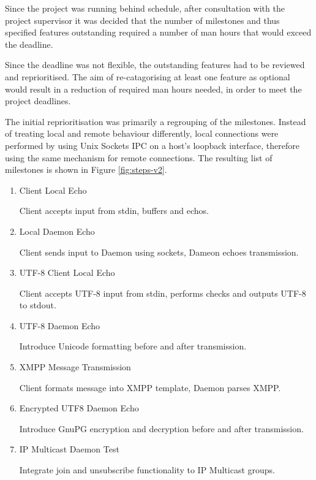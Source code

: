 
Since the project was running behind schedule, after consultation with
the project supervisor it was decided that the number of milestones and
thus specified features outstanding required a number of man hours that
would exceed the deadline.


Since the deadline was not flexible, the outstanding features had to be 
reviewed and reprioritised. The aim of re-catagorising at least one 
feature as optional would result in a reduction of required man hours 
needed, in order to meet the project deadlines.


The initial reprioritisation was primarily a regrouping of the
milestones. Instead of treating local and remote behaviour differently,
local connections were performed by using Unix Sockets IPC on a host's
loopback interface, therefore using the same mechanism for remote
connections. The resulting list of milestones is shown in Figure
\ref{fig:steps-v2}.

\begin{table}[hbt]
\label{fig:steps-v2}

\begin{center}

\begin{enumerate}

\item Client Local Echo 

	\subitem Client accepts input from stdin, buffers and echos.

\item Local Daemon Echo 

	\subitem Client sends input to Daemon using sockets, Dameon 
	echoes transmission.

\item UTF-8 Client Local Echo 

	\subitem Client accepts UTF-8 input from stdin, performs checks and
	outputs UTF-8 to stdout.

\item UTF-8 Daemon Echo

	\subitem Introduce Unicode formatting before and after transmission.

\item XMPP Message Transmission 

	\subitem Client formats message into XMPP template, Daemon parses
	XMPP.

\item Encrypted UTF8 Daemon Echo 

	\subitem Introduce GnuPG encryption and decryption before and after 
	transmission. 

\item IP Multicast Daemon Test

	\subitem Integrate join and unsubscribe functionality to IP Multicast
	groups.

\end{enumerate}

\end{center}

\caption{List of Milestones Reprioritised}

\end{table}


